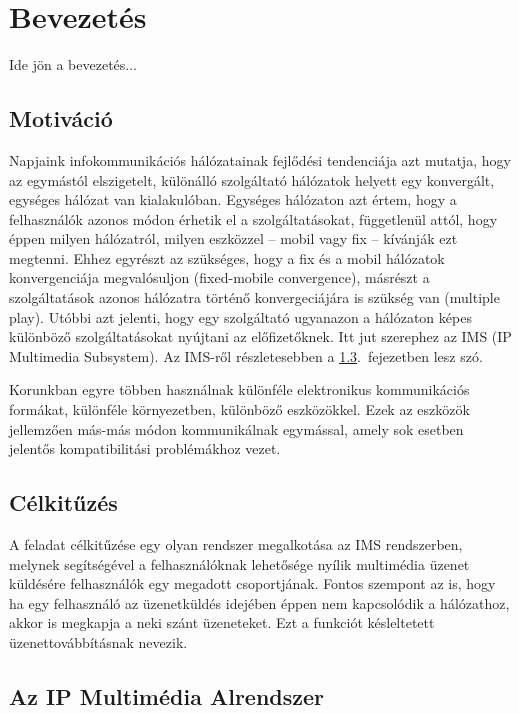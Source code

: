 
\section{Bevezetés}

Ide jön a bevezetés...\cite{wiley_ims}

\subsection{Motiváció}

Napjaink infokommunikációs hálózatainak fejlődési tendenciája azt mutatja, hogy az egymástól elszigetelt,
különálló szolgáltató hálózatok helyett egy konvergált, egységes hálózat van kialakulóban. Egységes hálózaton azt értem, hogy a felhasználók azonos módon érhetik el a szolgáltatásokat, függetlenül attól, hogy éppen milyen hálózatról, milyen eszközzel -- mobil vagy fix -- kívánják ezt megtenni. Ehhez egyrészt az szükséges, hogy a fix és a mobil hálózatok konvergenciája megvalósuljon (fixed-mobile convergence), másrészt a szolgáltatások azonos hálózatra történő konvergeciájára is szükség van (multiple play). Utóbbi azt jelenti, hogy egy szolgáltató ugyanazon a hálózaton képes különböző szolgáltatásokat nyújtani az előfizetőknek. Itt jut szerephez az IMS (IP Multimedia Subsystem). Az IMS-ről részletesebben a \ref{sec:ims}.~fejezetben lesz szó.

Korunkban egyre többen használnak különféle elektronikus kommunikációs formákat, különféle környezetben, különböző eszközökkel. Ezek az eszközök jellemzően más-más módon kommunikálnak egymással, amely sok esetben jelentős kompatibilitási problémákhoz vezet.

\subsection{Célkitűzés}

A feladat célkitűzése egy olyan rendszer megalkotása az IMS rendszerben, melynek
segítségével a felhasználóknak lehetősége nyílik multimédia üzenet küldésére felhasználók egy megadott csoportjának. Fontos szempont az is, hogy ha egy felhasználó az üzenetküldés idejében éppen nem kapcsolódik a hálózathoz, akkor is megkapja a neki szánt üzeneteket. Ezt a funkciót késleltetett üzenettovábbításnak nevezik.

\subsection{Az IP Multimédia Alrendszer}
\label{sec:ims}

